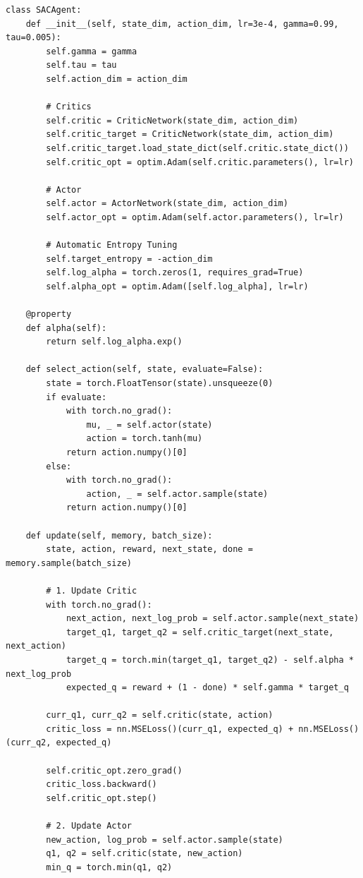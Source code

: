 \documentclass[12pt,a4paper]{article}
\theoremstyle{noteplain}
\theoremstyle{noteexercise}
\begin{document}
\begin{lstlisting}[caption={SAC Agent}, label={lst:sac}]
class SACAgent:
    def __init__(self, state_dim, action_dim, lr=3e-4, gamma=0.99, tau=0.005):
        self.gamma = gamma
        self.tau = tau
        self.action_dim = action_dim

        # Critics
        self.critic = CriticNetwork(state_dim, action_dim)
        self.critic_target = CriticNetwork(state_dim, action_dim)
        self.critic_target.load_state_dict(self.critic.state_dict())
        self.critic_opt = optim.Adam(self.critic.parameters(), lr=lr)

        # Actor
        self.actor = ActorNetwork(state_dim, action_dim)
        self.actor_opt = optim.Adam(self.actor.parameters(), lr=lr)

        # Automatic Entropy Tuning
        self.target_entropy = -action_dim
        self.log_alpha = torch.zeros(1, requires_grad=True)
        self.alpha_opt = optim.Adam([self.log_alpha], lr=lr)

    @property
    def alpha(self):
        return self.log_alpha.exp()

    def select_action(self, state, evaluate=False):
        state = torch.FloatTensor(state).unsqueeze(0)
        if evaluate:
            with torch.no_grad():
                mu, _ = self.actor(state)
                action = torch.tanh(mu)
            return action.numpy()[0]
        else:
            with torch.no_grad():
                action, _ = self.actor.sample(state)
            return action.numpy()[0]

    def update(self, memory, batch_size):
        state, action, reward, next_state, done = memory.sample(batch_size)

        # 1. Update Critic
        with torch.no_grad():
            next_action, next_log_prob = self.actor.sample(next_state)
            target_q1, target_q2 = self.critic_target(next_state, next_action)
            target_q = torch.min(target_q1, target_q2) - self.alpha * next_log_prob
            expected_q = reward + (1 - done) * self.gamma * target_q

        curr_q1, curr_q2 = self.critic(state, action)
        critic_loss = nn.MSELoss()(curr_q1, expected_q) + nn.MSELoss()(curr_q2, expected_q)

        self.critic_opt.zero_grad()
        critic_loss.backward()
        self.critic_opt.step()

        # 2. Update Actor
        new_action, log_prob = self.actor.sample(state)
        q1, q2 = self.critic(state, new_action)
        min_q = torch.min(q1, q2)
        

\end{lstlisting}
\end{document}
